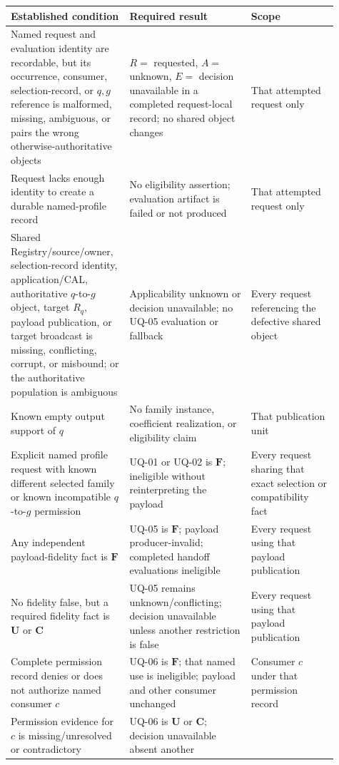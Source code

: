 \begin{longtable}{p{0.31\linewidth}p{0.35\linewidth}p{0.25\linewidth}}
\toprule
Established condition & Required result & Scope\\
\midrule
\endhead
Named request and evaluation identity are recordable, but its occurrence,
consumer, selection-record, or \(q,g\) reference is malformed, missing,
ambiguous, or pairs the wrong otherwise-authoritative objects &
\(R=\) requested, \(A=\) unknown, \(E=\) decision unavailable in a completed
request-local record; no shared object changes & That attempted request only\\
Request lacks enough identity to create a durable named-profile record &
No eligibility assertion; evaluation artifact is failed or not produced &
That attempted request only\\
Shared Registry/source/owner, selection-record identity, application/CAL,
authoritative \(q\)-to-\(g\) object, target \(R_q\), payload publication, or
target broadcast is missing, conflicting, corrupt, or misbound; or the
authoritative population is ambiguous & Applicability unknown or decision
unavailable; no UQ-05 evaluation or fallback & Every request referencing the
defective shared object\\
Known empty output support of \(q\) & No family instance, coefficient
realization, or eligibility claim & That publication unit\\
Explicit named profile request with known different selected family or
known incompatible \(q\)-to-\(g\) permission & UQ-01 or UQ-02 is
\(\mathbf F\); ineligible without reinterpreting the payload & Every request
sharing that exact selection or compatibility fact\\
Any independent payload-fidelity fact is \(\mathbf F\) & UQ-05 is
\(\mathbf F\); payload producer-invalid; completed handoff evaluations
ineligible & Every request using that payload publication\\
No fidelity false, but a required fidelity fact is \(\mathbf U\) or
\(\mathbf C\) & UQ-05 remains unknown/conflicting; decision unavailable
unless another restriction is false & Every request using that payload
publication\\
Complete permission record denies or does not authorize named consumer \(c\)
& UQ-06 is \(\mathbf F\); that named use is ineligible; payload and other
consumer unchanged & Consumer \(c\) under that permission record\\
Permission evidence for \(c\) is missing/unresolved or contradictory &
UQ-06 is \(\mathbf U\) or \(\mathbf C\); decision unavailable absent another

\end{longtable}
